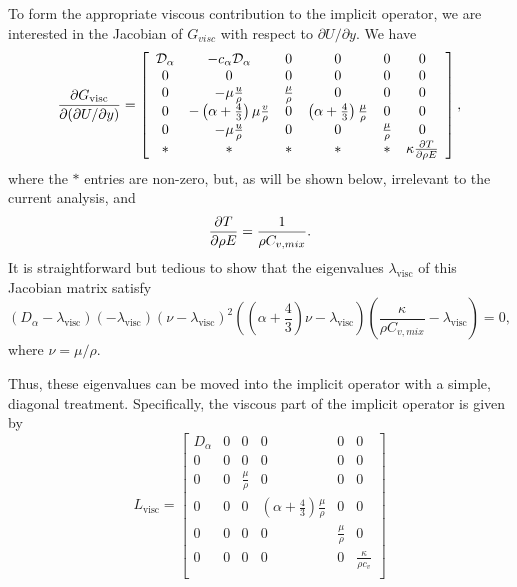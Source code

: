 To form the appropriate viscous contribution to the implicit
operator, we are interested in the Jacobian of $G_{visc}$ with respect
to $\partial U / \partial y$.  We have
%
\begin{equation*}
\frac{\partial G_{\mathrm{visc}}}{\partial (\partial U/ \partial y)} = \left[ \begin{array}{cccccc}
\mathcal{D}_{\alpha} & -c_{\alpha} \mathcal{D}_{\alpha} & 0 & 0 & 0 & 0 \\
0 & 0 & 0 & 0 & 0 & 0 \\
0 & - \mu \frac{u}{\rho} & \frac{\mu}{\rho} & 0 & 0 & 0 \\
0 & - \left(\alpha + \frac{4}{3} \right) \mu \frac{v}{\rho} & 0 & \left(\alpha + \frac{4}{3} \right) \frac{\mu}{\rho} & 0 & 0 \\
0 & - \mu \frac{u}{\rho} & 0 & 0 & \frac{\mu}{\rho} & 0 \\
* & * & * & * & * & \kappa \frac{\partial T}{\partial \rho E} \\
\end{array} \right],
\end{equation*}
% 
where the $*$ entries are non-zero, but, as will be shown below,
irrelevant to the current analysis, and
%
\begin{equation*}
\frac{\partial T}{\partial \rho E} = \frac{1}{\rho C_{v,mix}}.
\end{equation*}
% 
It is straightforward but tedious to show that the eigenvalues
$\lambda_{\mathrm{visc}}$ of this Jacobian matrix satisfy
%
\begin{equation*}
(D_{\alpha} - \lambda_{\mathrm{visc}}) (-\lambda_{\mathrm{visc}}) (\nu - \lambda_{\mathrm{visc}})^2  \left( \left( \alpha + \frac{4}{3} \right) \nu - \lambda_{\mathrm{visc}} \right) \left( \frac{\kappa}{\rho C_{v,mix}} - \lambda_{\mathrm{visc}} \right) = 0,
\end{equation*}
% 
where $\nu = \mu/\rho$.

Thus, these eigenvalues can be moved into the implicit operator with
a simple, diagonal treatment.  Specifically, the viscous part of the
implicit operator is given by
%
\begin{equation}
L_{\mathrm{visc}} = 
\left[
\begin{array}{cccccc}
 D_{\alpha} & 0 & 0 & 0 & 0 & 0 \\
 0 & 0 & 0 & 0 & 0 & 0 \\
 0 & 0 & \frac{\mu}{\rho} & 0 & 0 & 0 \\
 0 & 0 & 0 & \left(\alpha+\frac{4}{3}\right)\frac{\mu}{\rho} & 0 & 0 \\
 0 & 0 & 0 & 0 & \frac{\mu}{\rho} & 0 \\
 0 & 0 & 0 & 0 & 0 & \frac{\kappa}{\rho c_v} \\
\end{array}
\right]
\end{equation}


